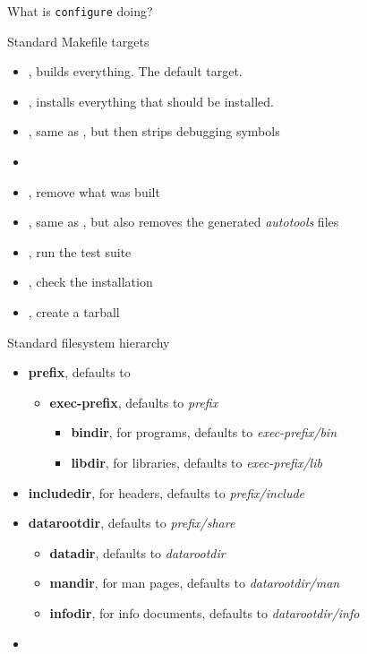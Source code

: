 \begin{frame}{What is {\tt configure} doing?}

\end{frame}

\begin{frame}{Standard Makefile targets}
  \begin{itemize}
  \item {}, builds everything. The default target.
  \item {}, installs everything that should be installed.
  \item {}, same as , but then strips
    debugging symbols
  \item {}
  \item {}, remove what was built
  \item {}, same as , but also removes the
    generated {\em autotools} files
  \item {}, run the test suite
  \item {}, check the installation
  \item {}, create a tarball
  \end{itemize}
\end{frame}

\begin{frame}{Standard filesystem hierarchy}
  \begin{itemize}
  \item {\bf prefix}, defaults to 
    \begin{itemize}
    \item {\bf exec-prefix}, defaults to {\em prefix}
      \begin{itemize}
      \item {\bf bindir}, for programs, defaults to {\em exec-prefix/bin}
      \item {\bf libdir}, for libraries, defaults to {\em exec-prefix/lib}
      \end{itemize}
    \end{itemize}
  \item {\bf includedir}, for headers, defaults to {\em prefix/include}
  \item {\bf datarootdir}, defaults to {\em prefix/share}
    \begin{itemize}
    \item {\bf datadir}, defaults to {\em datarootdir}
    \item {\bf mandir}, for man pages, defaults to {\em datarootdir/man}
    \item {\bf infodir}, for info documents, defaults to {\em datarootdir/info}
    \end{itemize}
  \item {}
  \end{itemize}
\end{frame}

